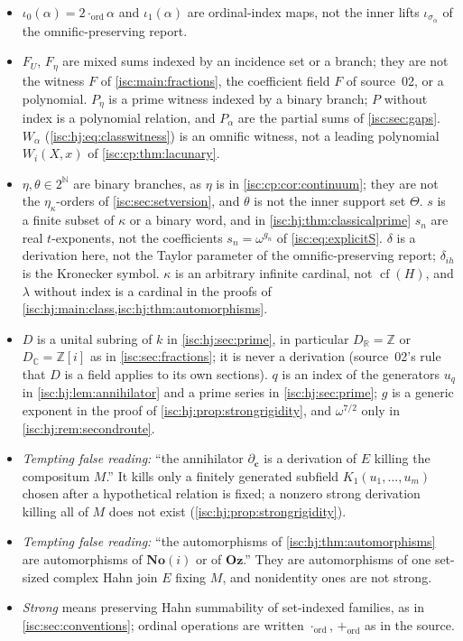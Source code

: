 \documentclass[11pt,letterpaper]{article}
\theoremstyle{definition}
\theoremstyle{remark}
\newcommand{\No}{\mathbf{No}}
\newcommand{\Oz}{\mathbf{Oz}}
\newcommand{\R}{\mathbb R}
\newcommand{\C}{\mathbb C}
\newcommand{\Z}{\mathbb Z}
\newcommand{\N}{\mathbb N}
\newcommand{\cf}{\operatorname{cf}}
\newcommand{\Ord}{\operatorname{ord}}%
\numberwithin{equation}{section}
\begin{document}
\begin{itemize}[leftmargin=*,itemsep=3pt]
\item $\iota_0(\alpha)=2\cdot_{\Ord}\alpha$ and $\iota_1(\alpha)$ are
ordinal-index maps, not the inner lifts $\iota_{\sigma_\alpha}$ of the
omnific-preserving report.
\item $F_U$, $F_\eta$ are mixed sums indexed by an incidence set or a
branch; they are not the witness $F$ of \cref{isc:main:fractions}, the
coefficient field $F$ of source~02, or a polynomial. $P_\eta$ is a prime
witness indexed by a binary branch; $P$ without index is a polynomial
relation, and $P_\alpha$ are the partial sums of \cref{isc:sec:gaps}.
$W_\alpha$ (\cref{isc:hj:eq:classwitness}) is an omnific witness, not a
leading polynomial $W_i(X,x)$ of \cref{isc:cp:thm:lacunary}.
\item $\eta,\theta\in2^{\N}$ are binary branches, as $\eta$ is in
\cref{isc:cp:cor:continuum}; they are not the $\eta_\kappa$-orders of
\cref{isc:sec:setversion}, and $\theta$ is not the inner support set
$\Theta$. $s$ is a finite subset of $\kappa$ or a binary word, and in
\cref{isc:hj:thm:classicalprime} $s_n$ are real $t$-exponents, not the
coefficients $s_n=\omega^{g_n}$ of \eqref{isc:eq:explicitS}. $\delta$ is a
derivation here, not the Taylor parameter of the omnific-preserving
report; $\delta_{ih}$ is the Kronecker symbol. $\kappa$ is an arbitrary
infinite cardinal, not $\cf(H)$, and $\lambda$ without index is a cardinal
in the proofs of \cref{isc:hj:main:class,isc:hj:thm:automorphisms}.
\item $D$ is a unital subring of $k$ in \cref{isc:hj:sec:prime}, in
particular $D_\R=\Z$ or $D_\C=\Z[i]$ as in \cref{isc:sec:fractions}; it is
never a derivation (source~02's rule that $D$ is a field applies to its own
sections). $q$ is an index of the generators $u_q$ in
\cref{isc:hj:lem:annihilator} and a prime series in
\cref{isc:hj:sec:prime}; $g$ is a generic exponent in the proof of
\cref{isc:hj:prop:strongrigidity}, and $\omega^{7/2}$ only in
\cref{isc:hj:rem:secondroute}.
\item \emph{Tempting false reading:} ``the annihilator
$\partial_{\mathbf c}$ is a derivation of $E$ killing the compositum $M$.''
It kills only a finitely generated subfield $K_1(u_1,\ldots,u_m)$ chosen
after a hypothetical relation is fixed; a nonzero strong derivation
killing all of $M$ does not exist (\cref{isc:hj:prop:strongrigidity}).
\item \emph{Tempting false reading:} ``the automorphisms of
\cref{isc:hj:thm:automorphisms} are automorphisms of $\No(i)$ or of
$\Oz$.'' They are automorphisms of one set-sized complex Hahn join $E$
fixing $M$, and nonidentity ones are not strong.
\item \emph{Strong} means preserving Hahn summability of set-indexed
families, as in \cref{isc:sec:conventions}; ordinal operations are written
$\cdot_{\Ord}$, $+_{\Ord}$ as in the source.
\end{itemize}
\end{document}
